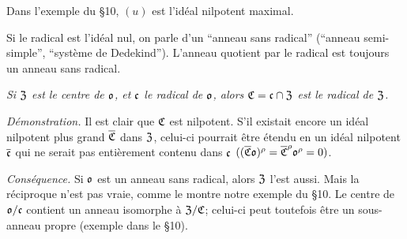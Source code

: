 Dans l'exemple du \S{}10, $(u)$ est l'idéal nilpotent maximal.

Si le radical est l'idéal nul, on parle d'un ``anneau sans radical'' (``anneau semi-simple'', ``système de Dedekind''). L'anneau quotient par le radical est toujours un anneau sans radical.

\emph{Si $\mathfrak{Z}$ est le centre de $\mathfrak{o}$, et $\mathfrak{c}$ le radical de $\mathfrak{o}$, alors $\mathfrak{C}=\mathfrak{c}\cap\mathfrak{Z}$ est le radical de $\mathfrak{Z}$.}

\emph{Démonstration.} Il est clair que $\mathfrak{C}$ est nilpotent. S'il existait encore un idéal nilpotent plus grand $\overline{\mathfrak{C}}$ dans $\mathfrak{Z}$, celui-ci pourrait être étendu en un idéal nilpotent $\overline{\mathfrak{c}}$ qui ne serait pas entièrement contenu dans $\mathfrak{c}$ $((\overline{\mathfrak{C}}\mathfrak{o})^\rho=\overline{\mathfrak{C}}^{\rho}\mathfrak{o}^\rho=0)$.

\emph{Conséquence.} Si $\mathfrak{o}$ est un anneau sans radical, alors $\mathfrak{Z}$ l'est aussi. Mais la réciproque n'est pas vraie, comme le montre notre exemple du \S{}10. Le centre de $\mathfrak{o}/\mathfrak{c}$ contient un anneau isomorphe à $\mathfrak{Z}/\mathfrak{C}$; celui-ci peut toutefois être un sous-anneau propre (exemple dans le \S{}10).
